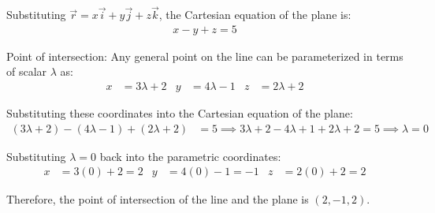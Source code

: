 \begin{enumerate}[label=\thesubsection.\arabic*, ref=\thesubsection.\theenumi]
Substituting $\vec{r} = x\vec{i} + y\vec{j} + z\vec{k}$, the Cartesian equation of the plane is:
\begin{align*}
	x - y + z = 5
\end{align*}

Point of intersection:
Any general point on the line can be parameterized in terms of scalar $\lambda$ as:
\begin{align*}
	x &= 3\lambda + 2 &
	y &= 4\lambda - 1 &
	z &= 2\lambda + 2
\end{align*}

Substituting these coordinates into the Cartesian equation of the plane:
\begin{align*}
	(3\lambda + 2) - (4\lambda - 1) + (2\lambda + 2) &= 5 \implies
	3\lambda + 2 - 4\lambda + 1 + 2\lambda + 2 = 5 \implies
	\lambda = 0
\end{align*}

Substituting $\lambda = 0$ back into the parametric coordinates:
\begin{align*}
	x &= 3(0) + 2 = 2 &
	y &= 4(0) - 1 = -1 &
	z &= 2(0) + 2 = 2
\end{align*}

Therefore, the point of intersection of the line and the plane is $(2, -1, 2)$.

\end{enumerate}


